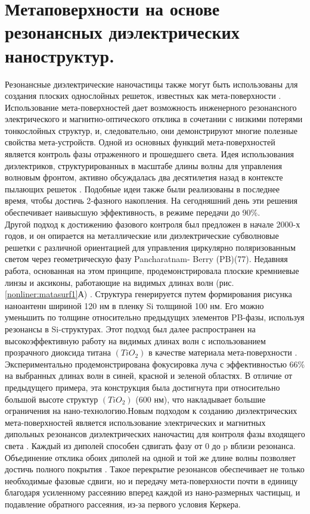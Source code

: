 \section{Метаповерхности на основе резонансных диэлектрических наноструктур.}
\hspace*{2mm}
Резонансные диэлектрические наночастицы также могут быть использованы для создания плоских однослойных решеток, известных как мета-поверхности \cite{flatOptMetasurf}. Использование мета-поверхностей дает возможность инженерного резонансного электрического и магнитно-оптического отклика в сочетании с низкими потерями тонкослойных структур, и, следовательно, они демонстрируют многие полезные свойства мета-устройств. Одной из основных функций мета-поверхностей является контроль фазы отраженного и прошедшего света. Идея использования диэлектриков, структурированных в масштабе длины волны для управления волновым фронтом, активно обсуждалась два десятилетия назад в контексте пылающих решеток \cite{desgFabrBinelem}. Подобные идеи также были реализованы в последнее время, чтобы достичь 2-фазного накопления.  На сегодняшний день эти решения обеспечивает наивысшую эффективность, в режиме передачи до 90\%.
\\
\hspace*{2mm}
Другой подход к достижению фазового контроля был предложен в начале 2000-х годов, и он опирается на металлические или диэлектрические субволновые решетки с различной ориентацией для управления циркулярно поляризованным светом через геометрическую фазу Pancharatnam- Berry (PB)(77). Недавняя работа, основанная на этом принципе, продемонстрировала плоские кремниевые линзы и аксиконы, работающие на видимых длинах волн (рис.  \ref{nonliner:matasurf1}А) \cite{delGradMet}. Структура генерируется путем формирования рисунка наноантенн шириной 120 нм в пленку Si толщиной 100 нм. Его можно уменьшить по толщине относительно предыдущих элементов PB-фазы, используя резонансы в Si-структурах. Этот подход был далее распространен на высокоэффективную работу на видимых длинах волн с использованием прозрачного диоксида титана $(TiO_{2})$ в качестве материала мета-поверхности \cite{DiffLimFoc}. Экспериментально продемонстрирована фокусировка луча с эффективностью 66\% на выбранных длинах волн в синей, красной и зеленой областях. В отличие от предыдущего примера, эта конструкция была достигнута при относительно большой высоте структур $(TiO_{2})$ (600 нм), что накладывает большие ограничения на нано-технологию.Новым подходом к созданию диэлектрических мета-поверхностей является использование электрических и магнитных дипольных резонансов диэлектрических наночастиц для контроля фазы входящего света \cite{delMetRefctPolar}. Каждый из диполей способен сдвигать фазу от 0 до p вблизи резонанса. Объединение отклика обоих диполей на одной и той же длине волны позволяет достичь полного покрытия \cite{highEffDel}. Такое перекрытие резонансов обеспечивает не только необходимые фазовые сдвиги, но и передачу мета-поверхности почти в единицу благодаря усиленному рассеянию вперед каждой из нано-размерных частицыц, и подавление обратного рассеяния, из-за первого условия Керкера.
